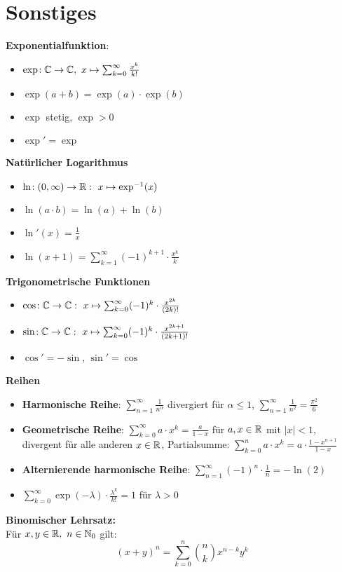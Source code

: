 \section{Sonstiges}

\textbf{Exponentialfunktion}:
\begin{itemize}
\item $\exp\!: \mathbb{C}\to\mathbb{C},\ x \mapsto \sum_{k=0}^\infty \frac{x^k}{k!}$

\item $\exp(a + b) = \exp(a) \cdot \exp(b)$

\item $\exp$ stetig, $\exp > 0$

\item $\exp' = \exp$
\end{itemize}

\textbf{Natürlicher Logarithmus}
\begin{itemize}
\item $\ln\!: (0,\infty)\to\mathbb{R}:\ x \mapsto \exp^{-1}(x)$

\item $\ln(a \cdot b) = \ln(a) + \ln(b)$

\item $\ln'(x) = \frac{1}{x}$

\item $\ln(x+1) = \sum_{k=1}^{\infty }(-1)^{k+1}\cdot {\frac {x^{k}}{k}}$
\end{itemize}

\textbf{Trigonometrische Funktionen}
\begin{itemize}
\item $\cos\!: \mathbb{C}\to\mathbb{C}:\ x \mapsto \sum_{k=0}^\infty (-1)^k \cdot \frac{x^{2k}}{(2k)!}$

\item $\sin\!: \mathbb{C}\to\mathbb{C}:\ x \mapsto \sum_{k=0}^\infty (-1)^k \cdot \frac{x^{2k+1}}{(2k+1)!}$

\item $\cos' = -\sin$, $\sin' = \cos$
\end{itemize}

\textbf{Reihen}
\begin{itemize}
\item \textbf{Harmonische Reihe}: $\sum_{n=1}^\infty \frac{1}{n^\alpha}$ divergiert für $\alpha\leq 1$, $\sum_{n=1}^\infty \frac{1}{n^2}=\frac{\pi^2}{6}$

\item \textbf{Geometrische Reihe}:
  $\sum_{k=0}^\infty a \cdot x^k = \frac{a}{1-x}$
  für $a,x\in\mathbb{R}$ mit $|x| < 1$, divergent für alle anderen $x\in\mathbb{R}$, Partialsumme: $\sum_{k=0}^n a \cdot x^k=a\cdot\frac{1-x^{n+1}}{1-x}$

\item \textbf{Alternierende harmonische Reihe}:
$\sum_{n=1}^\infty (-1)^n \cdot \frac{1}{n} = -\ln(2)$

\item $\sum_{k=0}^\infty \exp(-\lambda) \cdot \frac{\lambda^k}{k!} = 1$
  für $\lambda > 0$
\end{itemize}

\textbf{Binomischer Lehrsatz:}\\
Für $x,y\in\mathbb{R},\ n\in\mathbb{N}_0$ gilt:
\[
  (x+y)^n=\sum_{k=0}^n\binom{n}{k}x^{n-k}y^k
\]